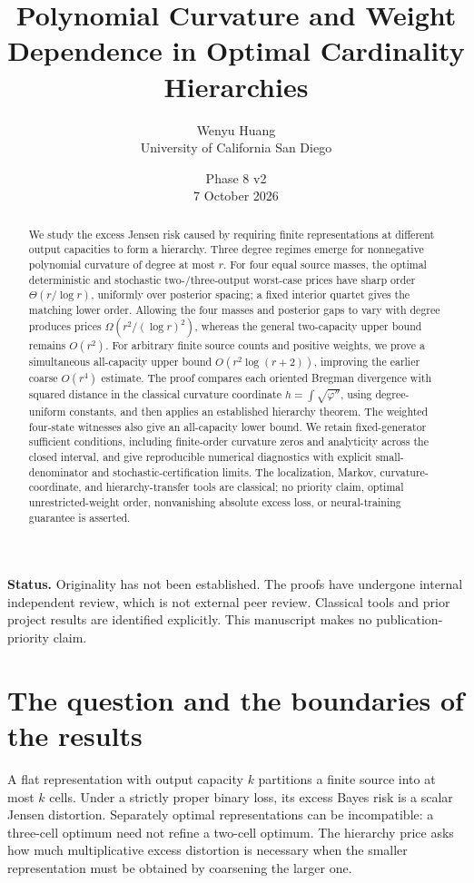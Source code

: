 \documentclass[11pt]{article}
\title{Polynomial Curvature and Weight Dependence in Optimal Cardinality Hierarchies}
\author{Wenyu Huang\\\small University of California San Diego}
\date{Phase 8 v2\\7 October 2026}
\theoremstyle{definition}\newtheorem{definition}[theorem]{Definition}
\theoremstyle{remark}\newtheorem{remark}[theorem]{Remark}
\begin{document}
\maketitle
\begin{center}\begin{minipage}{0.93\textwidth}\small
\textbf{Status.} Originality has not been established. The proofs have undergone internal independent review, which is not external peer review. Classical tools and prior project results are identified explicitly. This manuscript makes no publication-priority claim.
\end{minipage}\end{center}
\begin{abstract}
We study the excess Jensen risk caused by requiring finite representations at different output capacities to form a hierarchy. Three degree regimes emerge for nonnegative polynomial curvature of degree at most $r$. For four equal source masses, the optimal deterministic and stochastic two-/three-output worst-case prices have sharp order $\Theta(r/\log r)$, uniformly over posterior spacing; a fixed interior quartet gives the matching lower order. Allowing the four masses and posterior gaps to vary with degree produces prices $\Omega(r^2/(\log r)^2)$, whereas the general two-capacity upper bound remains $O(r^2)$. For arbitrary finite source counts and positive weights, we prove a simultaneous all-capacity upper bound $O(r^2\log(r+2))$, improving the earlier coarse $O(r^4)$ estimate. The proof compares each oriented Bregman divergence with squared distance in the classical curvature coordinate $h=\int\sqrt{\varphi''}$, using degree-uniform constants, and then applies an established hierarchy theorem. The weighted four-state witnesses also give an all-capacity lower bound. We retain fixed-generator sufficient conditions, including finite-order curvature zeros and analyticity across the closed interval, and give reproducible numerical diagnostics with explicit small-denominator and stochastic-certification limits. The localization, Markov, curvature-coordinate, and hierarchy-transfer tools are classical; no priority claim, optimal unrestricted-weight order, nonvanishing absolute excess loss, or neural-training guarantee is asserted.
\end{abstract}

\section{The question and the boundaries of the results}
A flat representation with output capacity $k$ partitions a finite source into at most $k$ cells. Under a strictly proper binary loss, its excess Bayes risk is a scalar Jensen distortion. Separately optimal representations can be incompatible: a three-cell optimum need not refine a two-cell optimum. The hierarchy price asks how much multiplicative excess distortion is necessary when the smaller representation must be obtained by coarsening the larger one.
\end{document}
